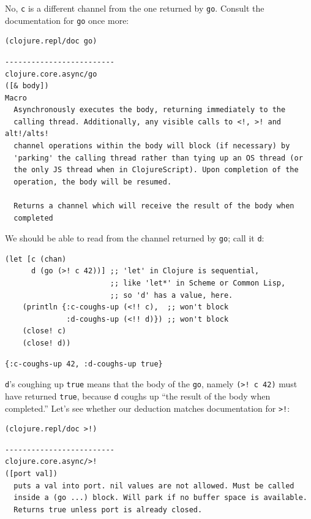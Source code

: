\documentclass[10pt,oneside,x11names]{article}
\begin{document}
No, \texttt{c} is a different channel from the one returned by \texttt{go}. Consult
the documentation for \texttt{go} once more:

\begin{verbatim}
(clojure.repl/doc go)
\end{verbatim}

\begin{verbatim}
-------------------------
clojure.core.async/go
([& body])
Macro
  Asynchronously executes the body, returning immediately to the
  calling thread. Additionally, any visible calls to <!, >! and alt!/alts!
  channel operations within the body will block (if necessary) by
  'parking' the calling thread rather than tying up an OS thread (or
  the only JS thread when in ClojureScript). Upon completion of the
  operation, the body will be resumed.

  Returns a channel which will receive the result of the body when
  completed
\end{verbatim}

We should be able to read from the channel returned by \texttt{go}; call it
\texttt{d}:

\begin{verbatim}
(let [c (chan)
      d (go (>! c 42))] ;; 'let' in Clojure is sequential,
                        ;; like 'let*' in Scheme or Common Lisp,
                        ;; so 'd' has a value, here.
    (println {:c-coughs-up (<!! c),  ;; won't block
              :d-coughs-up (<!! d)}) ;; won't block
    (close! c)
    (close! d))
\end{verbatim}

\begin{verbatim}
{:c-coughs-up 42, :d-coughs-up true}
\end{verbatim}


\texttt{d}'s coughing up \texttt{true} means that the body of the \texttt{go}, namely
\texttt{(>! c 42)} must have returned \texttt{true}, because \texttt{d} coughs up ``the result
of the body when completed.'' Let's see whether our deduction matches
documentation for \texttt{>!}:

\begin{verbatim}
(clojure.repl/doc >!)
\end{verbatim}

\begin{verbatim}
-------------------------
clojure.core.async/>!
([port val])
  puts a val into port. nil values are not allowed. Must be called
  inside a (go ...) block. Will park if no buffer space is available.
  Returns true unless port is already closed.
\end{verbatim}
\end{document}
